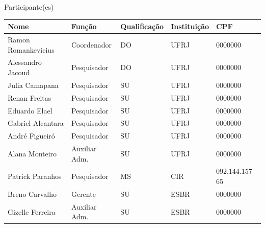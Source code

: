 \begin{center}

  
 \vfill



  {\LARGE Participante(es)}
  \vspace{0.50cm}



  \begin{center}
    \begin{tabular}{| l | l | l | l | l |}
    \hline
   	 Nome 					& Função			 & Qualificação 	& Instituição	 & CPF \\ \hline
   	 Ramon Romankevicius 		& Coordenador 	& DO			 & UFRJ 		& 0000000\\			\hline
   	Alessandro Jacoud 			& Pesquisador 		& DO 			& UFRJ 	& 0000000\\ 			\hline
   	Julia Camapana 			& Pesquisador		 & SU 			& UFRJ 	& 0000000\\ 			\hline
   	Renan Freitas 				& Pesquisador 		& SU 			& UFRJ 	& 0000000\\ 			\hline
  	Eduardo Elael 				& Pesquisador 		& SU 			& UFRJ	 & 0000000\\ 			\hline
  	Gabriel Alcantara 			& Pesquisador 		& SU 			& UFRJ 	& 0000000\\ 			\hline
   	André Figueiró 			& Pesquisador 		& SU 			& UFRJ 	& 0000000\\ 			\hline
   	Alana Monteiro 			 & Auxiliar Adm.	 & SU 			& UFRJ 	& 0000000\\ 			\hline
    	Patrick  Paranhos 			& Pesquisador 		& MS 			& CIR 	& 092.144.157-65\\ \hline
	Breno Carvalho				 & Gerente 		& SU 			& ESBR 	& 0000000\\ 	
\hline
	Gizelle Ferreira 			& Auxiliar Adm. 	& SU 			& ESBR 	& 0000000\\ 
\hline

    
    \hline 
    \end{tabular}
\end{center}






\end{center}

\newpage

\hypersetup{pageanchor=true}


